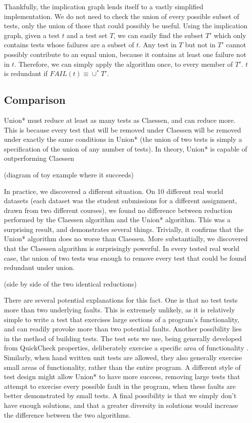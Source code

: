 \documentclass[11pt]{article}
\begin{document}
Thankfully, the implication graph lends itself to a vastly simplified implementation. We do not need to check the union of every possible subset of tests, only the union of those that could possibly be useful. Using the implication graph, given a test $t$ and a test set $T$, we can easily find the subset $T\prime$ which only contains tests whose failures are a subset of $t$. Any test in $T$ but not in $T\prime$ cannot possibly contribute to an equal union, because it contains at least one failure not in $t$. Therefore, we can simply apply the algorithm once, to every member of $T\prime$. $t$ is redundant if $FAIL(t) \equiv \cup^* T\prime$.

\subsection*{Comparison}
Union* must reduce at least as many tests as Claessen, and can reduce more. This is because every test that will be removed under Claessen will be removed under exactly the same conditions in Union* (the union of two tests is simply a specification of the union of any number of tests). In theory, Union* is capable of outperforming Claessen

(diagram of toy example where it succeeds)

In practice, we discovered a different situation. On 10 different real world datasets (each dataset was the student submissions for a different assignment, drawn from two different courses), we found no difference between reduction performed by the Claessen algorithm and the Union* algorithm. This was a surprising result, and demonstrates several things. Trivially, it confirms that the Union* algorithm does no worse than Claessen. More substantially, we discovered that the Claessen algorithm is surprisingly powerful. In every tested real world case, the union of two tests was enough to remove every test that could be found redundant under union.

(side by side of the two identical reductions)

There are several potential explanations for this fact. One is that no test tests more than two underlying faults. This is extremely unlikely, as it is relatively simple to write a test that exercises large sections of a program's functionality, and can readily provoke more than two potential faults. Another possibility lies in the method of building tests. The test sets we use, being generally developed from QuickCheck properties, deliberately exercise a specific area of functionality \cite{QuickCheck}. Similarly, when hand written unit tests are allowed, they also generally exercise small areas of functionality, rather than the entire program. A different style of test design might allow Union* to have more success, removing large tests that attempt to exercise every possible fault in the program, when these faults are better demonstrated by small tests. A final possibility is that we simply don't have enough solutions, and that a greater diversity in solutions would increase the difference between the two algorithms.
\end{document}
